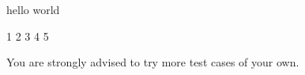 
\resett

\nextt

\begin{console}[fontsize=\small,commandchars=\\\{\}]
hello world
\end{console}

\nextt
\begin{console}[fontsize=\small,commandchars=\\\{\}]
1 2 3 4 5
\end{console}

You are strongly advised to try more test cases of your own.
